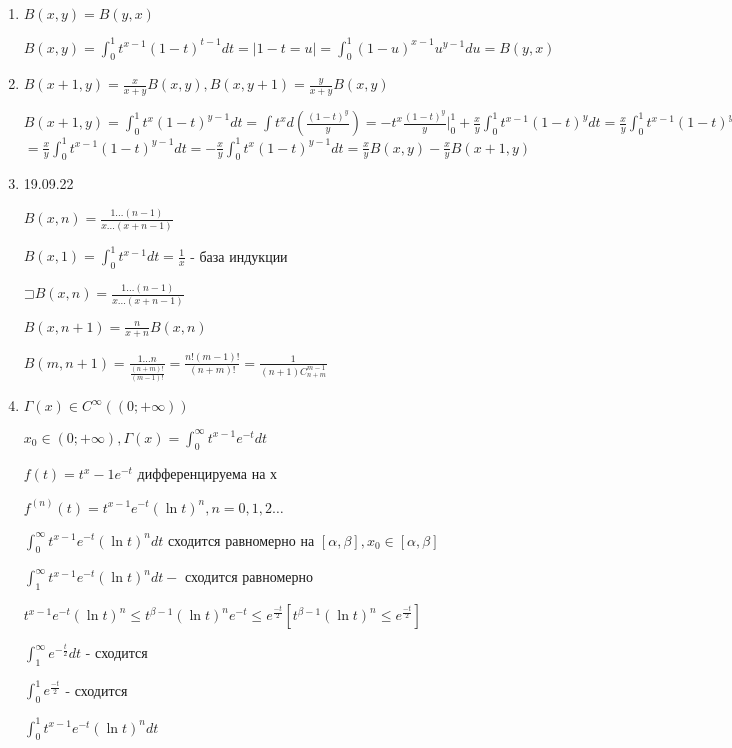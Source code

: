 \documentclass[a4paper, 12pt]{article}
\newcommand\letsymbol{\mathord{\sqsupset}}
\theoremstyle{definition}
\theoremstyle{remark}
\begin{document}
\begin{enumerate}
     \item $B(x,y) = B(y,x)$
     
     $B(x,y) = \int_0^1 t^{x-1}(1-t)^{t-1}dt = {\Bigg |}1- t = u{\Bigg |} = \int_0^1(1-u)^{x-1}u^{y-1}du = B(y,x)$
     \item $B(x+1, y) = \frac{x}{x+y}B(x,y), B(x,y+1) = \frac{y}{x+y}B(x,y)$
     
     $B(x+1, y) = \int_0^1 t^x (1-t)^{y-1}dt = \int t^x d(\frac{(1-t)^y}{y}) = -t^x\frac{(1-t)^y}{y}{\Bigg |}_0^1 +\frac{x}{y}\int_0^1 t^{x-1}(1-t)^y dt = \frac{x}{y}\int_0^1 t^{x-1} (1-t)^{y-1}(1-t)dt$
     $=\frac{x}{y}\int_0^1 t^{x-1}(1-t)^{y-1}dt = -\frac{x}{y}\int_0^1 t^x (1-t)^{y-1}dt = \frac{x}{y}B(x,y) - \frac{x}{y}B(x+1, y)$

     \item 19.09.22 
     
     $B(x, n) = \frac{1\dots (n-1)}{x\dots (x+n-1)}$
     
     $B(x, 1) = \int_0^1 t^{x-1}dt = \frac{1}{x}$ -  база индукции

     $\letsymbol{} B(x,n) = \frac{1\dots (n-1)}{x\dots (x+n-1)}$

     $B(x, n+1) = \frac{n}{x+n}B(x,n)$

     $B(m, n+1) = \frac{1\dots n}{\frac{(n+m)!}{(m-1)!}} = \frac{n!(m-1)!}{(n+m)!} = \frac{1}{(n+1)C_{n+m}^{m-1}}$

     \item $\Gamma(x)\in C^\infty((0;+\infty))$
     
     $x_0\in (0; +\infty), \Gamma(x) = \int_0^\infty t^{x-1}e^{-t}dt$

     $f(t) = t^x-1 e^{-t}$ дифференцируема на х

     $f^{(n)}(t) = t^{x-1}e^{-t}(\ln{t})^n, n = 0, 1, 2\dots$
     
     $\int_0^\infty t^{x-1}e^{-t}(\ln{t})^n dt$ сходится равномерно
     на $[\alpha, \beta], x_0\in[\alpha, \beta]$

     $\int_1^\infty t^{x-1} e^{-t}(\ln {t})^n dt -$ сходится равномерно

     $t^{x-1}e^{-t}(\ln{t})^n \leq t^{\beta - 1}(\ln {t})^n e^{-t}\leq e^{\frac{-t}{2}} [t^{\beta - 1}(\ln {t})^n \leq e^{\frac{-t}{2}}]$

     $\int_1^\infty e^{-\frac{t}{2}}dt$ - сходится

     $\int_0^1 e^{\frac{-t}{2}}$ -  сходится

     $\int_0^1 t^{x-1}e^{-t}(\ln{t})^n dt$


\end{enumerate}
\end{document}

